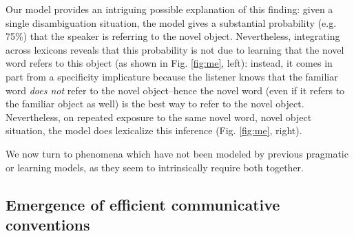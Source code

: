 \documentclass{article} %
\begin{document}
Our model provides an intriguing possible explanation of this finding: given a single disambiguation situation, the model gives a substantial probability (e.g. 75\%) that the speaker is referring to the novel object. Nevertheless, integrating across lexicons reveals that this probability is not due to learning that the novel word refers to this object (as shown in Fig. \ref{fig:me}, left): instead, it comes in part from a specificity implicature because the listener knows that the familiar word \emph{does not} refer to the novel object--hence the novel word (even if it refers to the familiar object as well) is the best way to refer to the novel object. Nevertheless, on repeated exposure to the same novel word, novel object situation, the model does lexicalize this inference (Fig. \ref{fig:me}, right). 




We now turn to phenomena which have not been modeled by previous pragmatic or learning models, as they seem to intrinsically require both together.

\subsection{Emergence of efficient communicative conventions}
\end{document}
